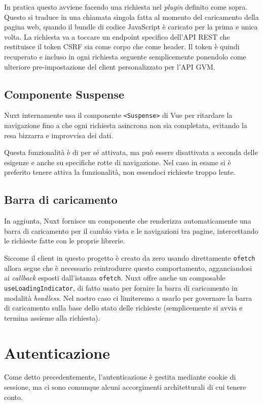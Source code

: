 In pratica questo avviene facendo una richiesta nel \emph{plugin} definito come sopra. Questo si traduce in una chiamata singola fatta al momento del caricamento della pagina web, quando il bundle di codice JavaScript è caricato per la prima e unica volta. La richiesta va a toccare un endpoint specifico dell'API REST che restituisce il token CSRF sia come corpo che come header. Il token è quindi recuperato e incluso in ogni richiesta seguente semplicemente ponendolo come ulteriore pre-impostazione del client personalizzato per l'API GVM.

\subsection{Componente Suspense}
Nuxt internamente usa il componente \texttt{<Suspense>} di Vue per ritardare la navigazione fino a che ogni richiesta asincrona non sia completata, evitando la resa bizzarra e improvvisa dei dati.

Questa funzionalità è di per sé attivata, ma può essere disattivata a seconda delle esigenze e anche su specifiche rotte di navigazione. Nel caso in esame si è preferito tenere attiva la funzionalità, non essendoci richieste troppo lente.

\subsection{Barra di caricamento}
In aggiunta, Nuxt fornisce un componente che renderizza automaticamente una barra di caricamento per il cambio vista e le navigazioni tra pagine, intercettando le richieste fatte con le proprie librerie.

Siccome il client in questo progetto è creato da zero usando direttamente \texttt{ofetch} allora segue che è necessario reintrodurre questo comportamento, agganciandosi ai \emph{callback} esposti dall'istanza \texttt{ofetch}. Nuxt offre anche un composable \texttt{useLoadingIndicator}, di fatto usato per fornire la barra di caricamento in modalità \emph{headless}. Nel nostro caso ci limiteremo a usarlo per governare la barra di caricamento sulla base dello stato delle richieste (semplicemente si avvia e termina assieme alla richiesta).

\section{Autenticazione}
Come detto precedentemente, l'autenticazione è gestita mediante cookie di sessione, ma ci sono comunque alcuni accorgimenti architetturali di cui tenere conto.

